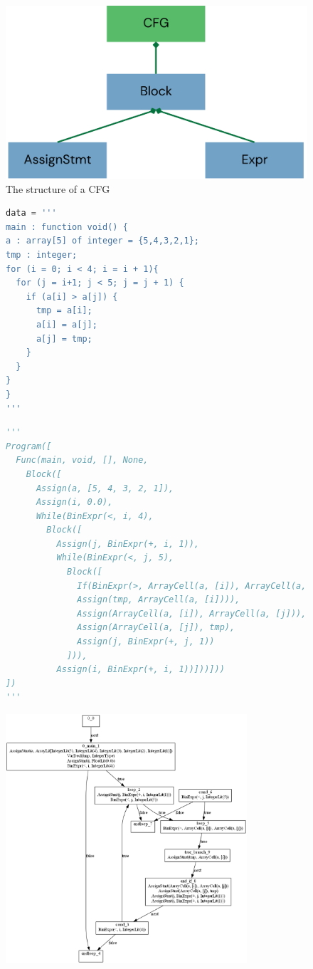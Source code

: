 \begin{figure}[ht]
  \centering
  \includegraphics[width = 0.5 \textwidth]{img/cfg.png}
  \caption{The structure of a CFG}
  \label{figure:cfg-structure}
\end{figure}

\begin{figure}[ht]
  \centering
  \begin{minipage}[t]{0.4\textwidth} %
    \begin{lstlisting}[language=Python]
data = '''
main : function void() {
a : array[5] of integer = {5,4,3,2,1};
tmp : integer;
for (i = 0; i < 4; i = i + 1){
  for (j = i+1; j < 5; j = j + 1) {
    if (a[i] > a[j]) {
      tmp = a[i];
      a[i] = a[j];
      a[j] = tmp;
    }
  }
}
}
'''
\end{lstlisting}
  \end{minipage}
  \hfill
  \begin{minipage}[t]{0.55\textwidth}
    \begin{lstlisting}[language=Python]
'''
Program([
  Func(main, void, [], None, 
    Block([
      Assign(a, [5, 4, 3, 2, 1]),
      Assign(i, 0.0),
      While(BinExpr(<, i, 4), 
        Block([
          Assign(j, BinExpr(+, i, 1)),
          While(BinExpr(<, j, 5), 
            Block([
              If(BinExpr(>, ArrayCell(a, [i]), ArrayCell(a, [j])), 
              Assign(tmp, ArrayCell(a, [i]))),
              Assign(ArrayCell(a, [i]), ArrayCell(a, [j])),
              Assign(ArrayCell(a, [j]), tmp),
              Assign(j, BinExpr(+, j, 1))
            ])),
          Assign(i, BinExpr(+, i, 1))]))]))
])
'''
\end{lstlisting}
  \end{minipage}
  \vfill
  \begin{minipage}[t]{\textwidth}
    \centering
    \includegraphics[width=0.8\textwidth]{img/cfg-example.png}

\end{minipage}
\end{figure}
